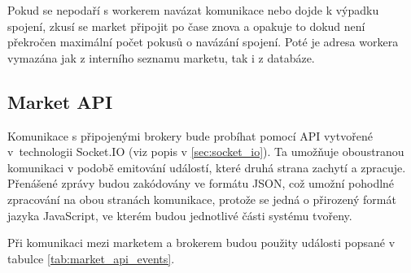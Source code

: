 \documentclass[thesis=M,czech]{FITthesis}[2012/06/26]
\begin{document}
	Pokud se nepodaří s workerem navázat komunikace nebo dojde k výpadku spojení, zkusí se market připojit po čase znova a opakuje to dokud není překročen maximální počet pokusů o navázání spojení. Poté je adresa workera vymazána jak z interního seznamu marketu, tak i z databáze.

\subsection{Market API}
\label{sec:market_api}

	Komunikace s připojenými brokery bude probíhat pomocí API vytvořené v~technologii Socket.IO (viz popis v \ref{sec:socket_io}). Ta umožňuje oboustranou komunikaci v podobě emitování událostí, které druhá strana zachytí a zpracuje. Přenášené zprávy budou zakódovány ve formátu JSON, což umožní pohodlné zpracování na obou stranách komunikace, protože se jedná o přirozený formát jazyka JavaScript, ve kterém budou jednotlivé části systému tvořeny.
	
	Při komunikaci mezi marketem a brokerem budou použity události popsané v tabulce \ref{tab:market_api_events}.
\end{document}
